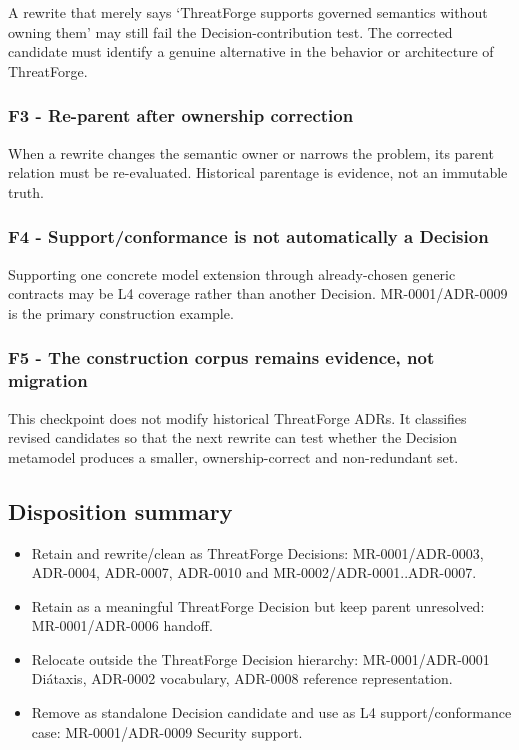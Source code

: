 \documentclass[
  10pt,
  a4paper,
]{article}
\providecommand{\tightlist}{%
  \setlength{\itemsep}{0pt}\setlength{\parskip}{0pt}}
\begin{document}
A rewrite that merely says `ThreatForge supports governed semantics
without owning them' may still fail the Decision-contribution test. The
corrected candidate must identify a genuine alternative in the behavior
or architecture of ThreatForge.

\subsubsection{F3 - Re-parent after ownership
correction}\label{f3---re-parent-after-ownership-correction}

When a rewrite changes the semantic owner or narrows the problem, its
parent relation must be re-evaluated. Historical parentage is evidence,
not an immutable truth.

\subsubsection{F4 - Support/conformance is not automatically a
Decision}\label{f4---supportconformance-is-not-automatically-a-decision}

Supporting one concrete model extension through already-chosen generic
contracts may be L4 coverage rather than another Decision.
MR-0001/ADR-0009 is the primary construction example.

\subsubsection{F5 - The construction corpus remains evidence, not
migration}\label{f5---the-construction-corpus-remains-evidence-not-migration}

This checkpoint does not modify historical ThreatForge ADRs. It
classifies revised candidates so that the next rewrite can test whether
the Decision metamodel produces a smaller, ownership-correct and
non-redundant set.

\subsection{Disposition summary}\label{disposition-summary}

\begin{itemize}
\tightlist
\item
  Retain and rewrite/clean as ThreatForge Decisions: MR-0001/ADR-0003,
  ADR-0004, ADR-0007, ADR-0010 and MR-0002/ADR-0001..ADR-0007.
\item
  Retain as a meaningful ThreatForge Decision but keep parent
  unresolved: MR-0001/ADR-0006 handoff.
\item
  Relocate outside the ThreatForge Decision hierarchy: MR-0001/ADR-0001
  Diátaxis, ADR-0002 vocabulary, ADR-0008 reference representation.
\item
  Remove as standalone Decision candidate and use as L4
  support/conformance case: MR-0001/ADR-0009 Security support.
\end{itemize}
\end{document}
